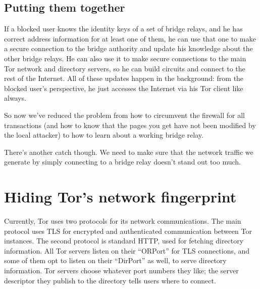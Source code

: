 \documentclass{llncs}
\begin{document}
\subsection{Putting them together}
\label{subsec:relay-together}

If a blocked user knows the identity keys of a set of bridge relays, and
he has correct address information for at least one of them, he can use
that one to make a secure connection to the bridge authority and update
his knowledge about the other bridge relays. He can also use it to make
secure connections to the main Tor network and directory servers, so he
can build circuits and connect to the rest of the Internet. All of these
updates happen in the background: from the blocked user's perspective,
he just accesses the Internet via his Tor client like always.

So now we've reduced the problem from how to circumvent the firewall
for all transactions (and how to know that the pages you get have not
been modified by the local attacker) to how to learn about a working
bridge relay.

There's another catch though. We need to make sure that the network
traffic we generate by simply connecting to a bridge relay doesn't stand
out too much.





\section{Hiding Tor's network fingerprint}
\label{sec:network-fingerprint}
\label{subsec:enclave-dirs}

Currently, Tor uses two protocols for its network communications. The
main protocol uses TLS for encrypted and authenticated communication
between Tor instances. The second protocol is standard HTTP, used for
fetching directory information. All Tor servers listen on their ``ORPort''
for TLS connections, and some of them opt to listen on their ``DirPort''
as well, to serve directory information. Tor servers choose whatever port
numbers they like; the server descriptor they publish to the directory
tells users where to connect.
\end{document}
